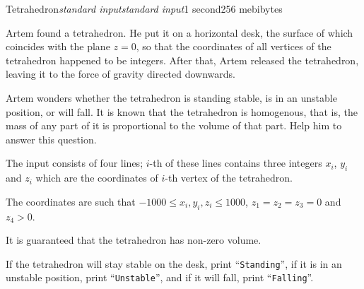 \begin{problem}{Tetrahedron}{\textsl{standard input}}{\textsl{standard input}}{1 second}{256 mebibytes}{}


Artem found a tetrahedron.
He put it on a horizontal desk, the surface of which coincides with the plane $z = 0$, so that the coordinates of all vertices of the tetrahedron happened to be integers.
After that, Artem released the tetrahedron, leaving it to the force of gravity directed downwards.

Artem wonders whether the tetrahedron is standing stable, is in an unstable position, or will fall.
It is known that the tetrahedron is homogenous, that is, the mass of any part of it is proportional to the volume of that part.
Help him to answer this question.

\InputFile
The input consists of four lines; $i$-th of these lines contains three integers $x_i$, $y_i$ and $z_i$ which are the coordinates of $i$-th vertex of the tetrahedron.

The coordinates are such that $-1000 \le x_i, y_i, z_i \le 1000$, $z_1 = z_2 = z_3 = 0$ and $z_4 > 0$.

It is guaranteed that the tetrahedron has non-zero volume.

\OutputFile
If the tetrahedron will stay stable on the desk, print ``\texttt{Standing}'',
if it is in an unstable position, print ``\texttt{Unstable}'',
and if it will fall, print ``\texttt{Falling}''.


\Examples

\begin{example}
%
%
%
\end{example}

\end{problem}
